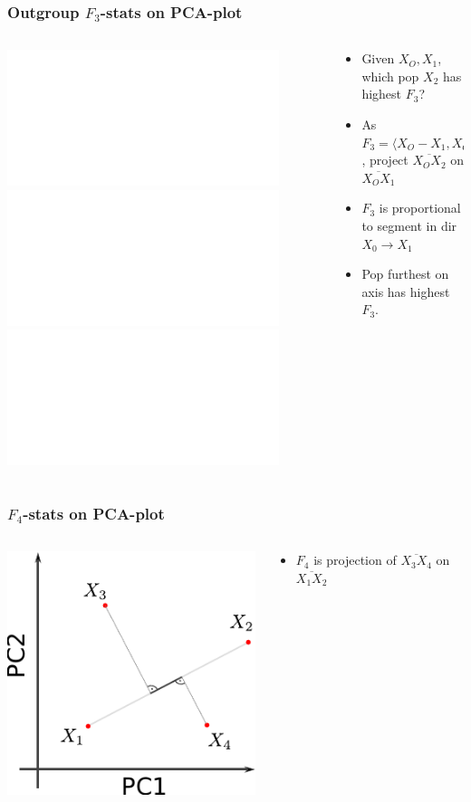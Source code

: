 \documentclass[11pt]{beamer}
\begin{document}
\begin{frame}
	\frametitle{Outgroup $F_3$-stats on PCA-plot}
	\begin{columns}
		\begin{column}{0.4\textwidth}
			\includegraphics<2>{figures/f3_on_pca_3b.pdf}
			\includegraphics<3>{figures/f3_on_pca_3.pdf}		
			\includegraphics<4->{figures/f3_on_pca_3c.pdf}			
		\end{column}
		\begin{column}{0.6\textwidth}
			\begin{itemize}
				\item<1-> Given $X_O, X_1$, which pop $X_2$ has highest $F_3$?	
				\item<2-> As $F_3 = \langle X_O - X_1, X_O - X_2 \rangle$, project $\overline{X_OX_2}$ on $\overline{X_OX_1}$
				\item<3-> $F_3$ is proportional to segment in dir $X_0 \rightarrow X_1$
				\item<4-> Pop furthest on axis has highest $F_3$.
			\end{itemize}		
		\end{column}
	\end{columns}
\end{frame}



\begin{frame}
\frametitle{ $F_4$-stats on PCA-plot}
\begin{columns}
	\begin{column}{0.4\textwidth}
		\includegraphics{figures/f4_on_pca.pdf}
	\end{column}
	\begin{column}{0.6\textwidth}
		\begin{itemize}
			\item<1-> $F_4$ is projection of $\overline{X_3X_4}$ on $\overline{X_1X_2}$
		\end{itemize}		
	\end{column}
\end{columns}
\end{frame}
\end{document}

